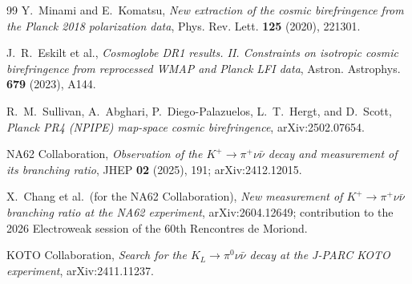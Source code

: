\begin{thebibliography}{99}
Y.~Minami and E.~Komatsu,
\newblock \emph{New extraction of the cosmic birefringence from the Planck 2018 polarization data},
\newblock Phys. Rev. Lett. \textbf{125} (2020), 221301.

J.~R.~Eskilt et al.,
\newblock \emph{Cosmoglobe DR1 results. II. Constraints on isotropic cosmic birefringence from reprocessed WMAP and Planck LFI data},
\newblock Astron. Astrophys. \textbf{679} (2023), A144.

R.~M.~Sullivan, A.~Abghari, P.~Diego-Palazuelos, L.~T.~Hergt, and D.~Scott,
\newblock \emph{Planck PR4 (NPIPE) map-space cosmic birefringence},
\newblock arXiv:2502.07654.

NA62 Collaboration,
\newblock \emph{Observation of the $K^{+}\to\pi^{+}\nu\bar{\nu}$ decay and measurement of its branching ratio},
\newblock JHEP \textbf{02} (2025), 191; arXiv:2412.12015.

X.~Chang et al.\ (for the NA62 Collaboration),
\newblock \emph{New measurement of $K^{+}\to\pi^{+}\nu\bar{\nu}$ branching ratio at the NA62 experiment},
\newblock arXiv:2604.12649; contribution to the 2026 Electroweak session of the 60th Rencontres de Moriond.

KOTO Collaboration,
\newblock \emph{Search for the $K_{L}\to\pi^{0}\nu\bar{\nu}$ decay at the J-PARC KOTO experiment},
\newblock arXiv:2411.11237.

\end{thebibliography}


